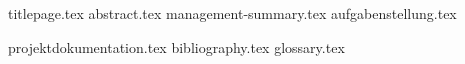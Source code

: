 \documentclass{scrbook}
\begin{document}
    \frontmatter
          {titlepage.tex}
          \clearpage
          {abstract.tex}
		  {management-summary.tex}
		  {aufgabenstellung.tex}

    \tableofcontents

    \listoffigures

    \listoftables

	\renewcommand\listoflistingscaption{Quellcodeverzeichnis}
	\listoflistings

    \mainmatter
      {projektdokumentation.tex}
	  {bibliography.tex}
      {glossary.tex}
      
\end{document}
